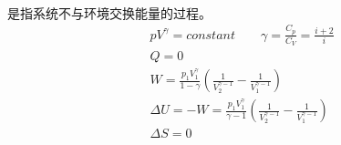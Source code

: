\begin{Itemize}
\begin{equation}
\begin{aligned}
                \end{aligned}
                \nonumber
            \end{equation}
            \item {}是指系统不与环境交换能量的过程。
            \begin{equation}
                \begin{aligned}
                    &pV^{\gamma} = constant \qquad \gamma = \frac{C_p}{C_V} = \frac{i+2}{i}\\
                    &Q = 0\\
                    &W = \frac{p_{1}V_{1}^{\gamma}}{1-\gamma}\left(\frac{1}{V_{2}^{\gamma-1}}-\frac{1}{V_1^{\gamma-1}}\right)\\
                    &\Delta U = -W =\frac{p_{1}V_{1}^{\gamma}}{\gamma - 1}\left(\frac{1}{V_{2}^{\gamma-1}}-\frac{1}{V_1^{\gamma-1}}\right)\\ 
                    &\Delta S = 0
                \end{aligned}
                \nonumber
            \end{equation}
        \end{Itemize}
    \section[热力学第二定律]{}

